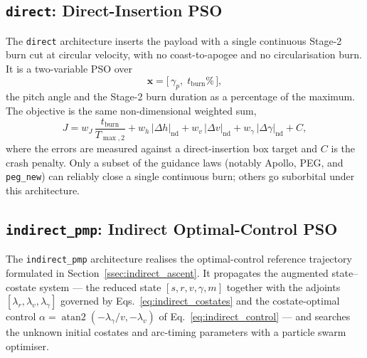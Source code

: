 \subsection{\texttt{direct}: Direct-Insertion PSO}
\label{ssec:direct}

The \texttt{direct} architecture inserts the payload with a single continuous
Stage-2 burn cut at circular velocity, with no coast-to-apogee and no
circularisation burn. It is a two-variable PSO over
\begin{equation}
  \mathbf{x} = \bigl[\,\gamma_p,\; t_{\mathrm{burn}}\%\,\bigr],
  \label{eq:direct_vector}
\end{equation}
the pitch angle and the Stage-2 burn duration as a percentage of the maximum. The
objective is the same non-dimensional weighted sum,
\begin{equation}
  J = w_J\,\frac{t_{\mathrm{burn}}}{T_{\max,2}}
    + w_h\,\bigl|\Delta h\bigr|_{\mathrm{nd}}
    + w_v\,\bigl|\Delta v\bigr|_{\mathrm{nd}}
    + w_\gamma\,\bigl|\Delta\gamma\bigr|_{\mathrm{nd}} + C,
  \label{eq:direct_objective}
\end{equation}
where the errors are measured against a direct-insertion box target and $C$ is the
crash penalty. Only a subset of the guidance laws (notably Apollo, PEG, and
\texttt{peg\_new}) can reliably close a single continuous burn; others go
suborbital under this architecture.

\subsection{\texttt{indirect\_pmp}: Indirect Optimal-Control PSO}
\label{sssec:indirect_pmp}

The \texttt{indirect\_pmp} architecture realises the optimal-control reference
trajectory formulated in Section~\ref{ssec:indirect_ascent}. It propagates the
augmented state--costate system --- the reduced state $[s,r,v,\gamma,m]$ together
with the adjoints $[\lambda_r,\lambda_v,\lambda_\gamma]$ governed by
Eqs.~\eqref{eq:indirect_costates} and the costate-optimal control
$\alpha=\operatorname{atan2}(-\lambda_\gamma/v,-\lambda_v)$ of
Eq.~\eqref{eq:indirect_control} --- and searches the unknown initial costates and
arc-timing parameters with a particle swarm optimiser.

